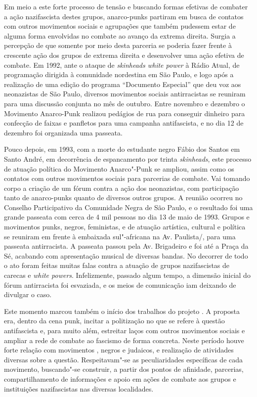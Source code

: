 Em meio a este forte processo de tensão e buscando formas efetivas de combater a ação nazifascista destes grupos, anarco-punks partiram em busca de contatos com outros movimentos sociais e agrupações que também pudessem estar de alguma forma envolvidas no combate ao avanço da extrema direita. Surgia a percepção de que somente por meio desta parceria se poderia fazer frente à crescente ação dos grupos de extrema direita e desenvolver uma ação efetiva de combate. Em 1992, ante o ataque de \emph{skinheads white power} à Rádio Atual, de programação dirigida à comunidade nordestina em São Paulo, e logo após a realização de uma edição do programa ``Documento Especial'' que deu voz aos neonazistas de São Paulo, diversos movimentos sociais antirracistas se reuniram para uma discussão conjunta no mês de outubro. Entre novembro e dezembro o Movimento Anarco-Punk realizou pedágios de rua para conseguir dinheiro para confecção de faixas e panfletos para uma campanha antifascista, e no dia 12 de dezembro foi organizada uma passeata.

Pouco depois, em 1993, com a morte do estudante negro Fábio dos Santos em Santo André, em decorrência de espancamento por trinta \emph{skinheads}, este processo de atuação política do Movimento Anarco"-Punk se ampliou, assim como os contatos com outros movimentos sociais para parcerias de combate. Vai tomando corpo a criação de um fórum contra a ação dos neonazistas, com participação tanto de anarco-punks quanto de diversos outros grupos. A reunião ocorreu no Conselho Participativo da Comunidade Negra de São Paulo, e o resultado foi uma grande passeata com cerca de 4 mil pessoas no dia 13 de maio de 1993. Grupos e movimentos punks, negros, feministas, e de atuação artística, cultural e política se reuniram em frente à embaixada sul"-africana na Av. Paulista/, para uma passeata antirracista. A passeata passou pela Av. Brigadeiro e foi até a Praça da Sé, acabando com apresentação musical de diversas bandas.  No decorrer de todo o ato foram feitas muitas falas contra a atuação de grupos nazifascistas de carecas e \emph{white powers}. Infelizmente, passado algum tempo, a dimensão inicial do fórum antirracista foi esvaziada, e os meios de comunicação iam deixando de divulgar o caso.

Este momento marcou também o início dos trabalhos do projeto . A proposta era, dentro da cena punk, incitar a politização no que se refere à questão antifascista e, para muito além, estreitar laços com outros movimentos sociais e ampliar a rede de combate ao fascismo de forma concreta. Neste período houve forte relação com movimentos , negros e judaicos, e realização de atividades diversas sobre a questão. Respeitavam"-se as peculiaridades específicas de cada movimento, buscando"-se construir, a partir dos pontos de afinidade, parcerias, compartilhamento de informações e apoio em ações de combate aos grupos e instituições nazifascistas nas diversas localidades.


